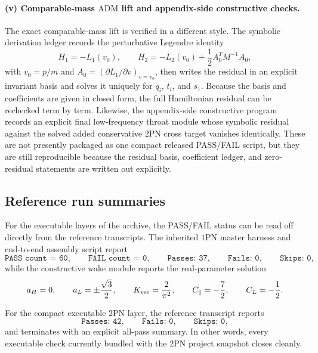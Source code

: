 \documentclass[11pt]{article}
\newcommand{\OnePN}{\mathrm{1PN}}
\newcommand{\TwoPN}{\mathrm{2PN}}
\newcommand{\ADM}{\mathrm{ADM}}
\begin{document}
\paragraph{(v) Comparable-mass \texorpdfstring{$\ADM$}{ADM} lift and appendix-side constructive checks.}
The exact comparable-mass lift is verified in a different style.
The symbolic derivation ledger records the perturbative Legendre identity
\begin{equation}
H_1=-L_1(v_0),
\qquad
H_2=-L_2(v_0)+\frac12 A_0^T M^{-1}A_0,
\label{eq:verification-legendre-identity}
\end{equation}
with \(v_0=p/m\) and \(A_0=(\partial L_1/\partial v)_{v=v_0}\), then writes the residual
in an explicit invariant basis and solves it uniquely for
\(q_i\), \(t_i\), and \(s_1\).
Because the basis and coefficients are given in closed form, the full Hamiltonian residual
can be rechecked term by term.
Likewise, the appendix-side constructive program records an explicit final low-frequency
throat module whose symbolic residual against the solved added conservative
\(\TwoPN\) cross target vanishes identically.
These are not presently packaged as one compact released PASS/FAIL script, but they are
still reproducible because the residual basis, coefficient ledger, and zero-residual
statements are written out explicitly.

\subsection{Reference run summaries}
\label{sec:verification-summaries}

For the executable layers of the archive, the PASS/FAIL status can be read off directly
from the reference transcripts.
The inherited \(\OnePN\) master harness and end-to-end assembly script report
\begin{equation}
\texttt{PASS count = 60},
\qquad
\texttt{FAIL count = 0},
\qquad
\texttt{Passes: 37},
\qquad
\texttt{Fails: 0},
\qquad
\texttt{Skips: 0},
\label{eq:verification-1pn-counts}
\end{equation}
while the constructive wake module reports the real-parameter solution
\begin{equation}
a_H=0,
\qquad
a_L=\pm\frac{\sqrt3}{2},
\qquad
K_{\rm vec}=\frac{2}{\pi^2},
\qquad
C_{\parallel}=-\frac72,
\qquad
C_L=-\frac12.
\label{eq:verification-1pn-wake}
\end{equation}

For the compact executable \(\TwoPN\) layer, the reference transcript reports
\begin{equation}
\texttt{Passes: 42},
\qquad
\texttt{Fails: 0},
\qquad
\texttt{Skips: 0},
\label{eq:verification-2pn-counts}
\end{equation}
and terminates with an explicit all-pass summary.
In other words, every executable check currently bundled with the \(\TwoPN\) project
snapshot closes cleanly.
\end{document}

